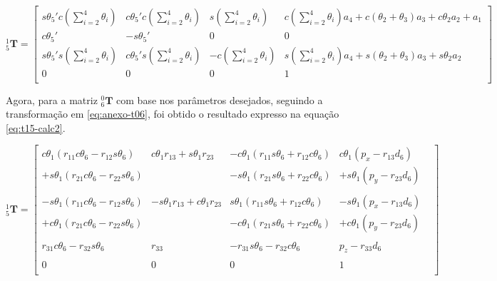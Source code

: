 \begin{equation}
    \label{eq:t15-calc}
    ^1_5\textbf{T} = 
    \begin{bmatrix}
        s\theta_5'c(\sum\limits_{i=2}^4\theta_i) & c\theta_5'c(\sum\limits_{i=2}^4\theta_i) & s(\sum\limits_{i=2}^4\theta_i)  & c(\sum\limits_{i=2}^4\theta_i)a_4 + c(\theta_2+\theta_3)a_3 + c\theta_2a_2 + a_1 \\
        c\theta_5'          & -s\theta_5'         & 0          & 0 \\
        s\theta_5's(\sum\limits_{i=2}^4\theta_i) & c\theta_5's(\sum\limits_{i=2}^4\theta_i) & -c(\sum\limits_{i=2}^4\theta_i) & s(\sum\limits_{i=2}^4\theta_i)a_4 + s(\theta_2+\theta_3)a_3 + s\theta_2a_2 \\
           0   &    0   &    0   &  1  \\    
    \end{bmatrix}
\end{equation}

Agora, para a matriz $^0_6\textbf{T}$ com base nos parâmetros desejados, seguindo a transformação em \ref{eq:anexo-t06}, 
foi obtido o resultado expresso na equação \ref{eq:t15-calc2}.

\begin{equation}
    \label{eq:t15-calc2}
    ^1_5\textbf{T} = 
    \begin{bmatrix}
         c\theta_1(r_{11}c\theta_6-r_{12}s\theta_6) &  c\theta_1r_{13}+s\theta_1r_{23} & -c\theta_1(r_{11}s\theta_6+r_{12}c\theta_6) &  c\theta_1(p_x-r_{13}d_6) \\
        +s\theta_1(r_{21}c\theta_6-r_{22}s\theta_6) &                      & -s\theta_1(r_{21}s\theta_6+r_{22}c\theta_6) & +s\theta_1(p_y-r_{23}d_6) \\
        & & & & \\
        -s\theta_1(r_{11}c\theta_6-r_{12}s\theta_6) & -s\theta_1r_{13}+c\theta_1r_{23} &  s\theta_1(r_{11}s\theta_6+r_{12}c\theta_6) & -s\theta_1(p_x-r_{13}d_6) \\
        +c\theta_1(r_{21}c\theta_6-r_{22}s\theta_6) &                      & -c\theta_1(r_{21}s\theta_6+r_{22}c\theta_6) & +c\theta_1(p_y-r_{23}d_6) \\
        & & & & \\        
             r_{31}c\theta_6-r_{32}s\theta_6  &         r_{33}       &     -r_{31}s\theta_6-r_{32}c\theta_6  &      p_z-r_{33}d_6  \\
        & & & & \\
                    0             &            0         &              0            &           1         \\    
    \end{bmatrix}
\end{equation}

